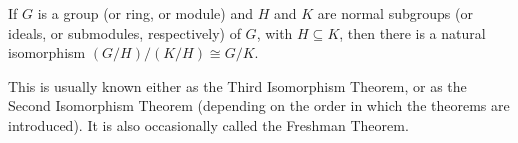 \documentclass{article}
\begin{document}

If $G$ is a group (or ring, or module) and $H$ and $K$ are normal subgroups (or ideals, or submodules, respectively) of $G$, with $H\subseteq K$, then there is a natural isomorphism $(G/H)/(K/H)\cong G/K$.

This is usually known either as the Third Isomorphism Theorem, or as the Second Isomorphism Theorem (depending on the order in which the theorems are introduced). It is also occasionally called the Freshman Theorem.
\end{document}

